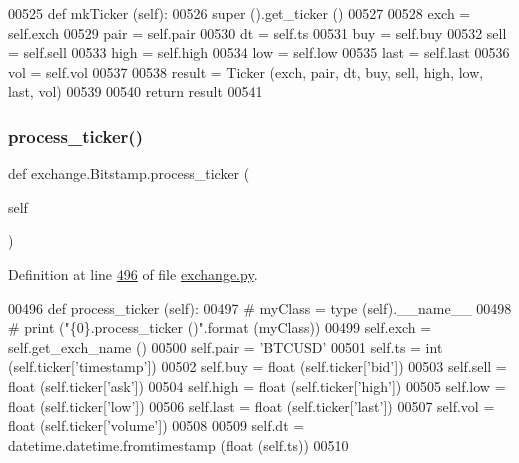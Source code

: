 \begin{DoxyCode}
00525     \textcolor{keyword}{def }mkTicker (self):
00526         super ().get\_ticker ()
00527         
00528         exch = self.exch
00529         pair = self.pair
00530         dt   = self.ts
00531         buy  = self.buy
00532         sell = self.sell
00533         high = self.high
00534         low  = self.low
00535         last = self.last
00536         vol  = self.vol
00537         
00538         result = Ticker (exch, pair, dt, buy, sell, high, low, last, vol)
00539         
00540         \textcolor{keywordflow}{return} result
00541     
\end{DoxyCode}
\mbox{\label{classexchange_1_1_bitstamp_ac963eebe537661b988f0ba0ff72514b5}} 
\subsubsection{\texorpdfstring{process\+\_\+ticker()}{process\_ticker()}}
{\footnotesize\ttfamily def exchange.\+Bitstamp.\+process\+\_\+ticker (\begin{DoxyParamCaption}\item[{}]{self }\end{DoxyParamCaption})}



Definition at line \hyperlink{exchange_8py_source_l00496}{496} of file \hyperlink{exchange_8py_source}{exchange.\+py}.


\begin{DoxyCode}
00496     \textcolor{keyword}{def }process\_ticker (self):
00497 \textcolor{comment}{#        myClass = type (self).\_\_name\_\_}
00498 \textcolor{comment}{#        print ("\{0\}.process\_ticker ()".format (myClass))}
00499         self.exch = self.get\_exch\_name ()
00500         self.pair = \textcolor{stringliteral}{'BTCUSD'}
00501         self.ts   = int   (self.ticker[\textcolor{stringliteral}{'timestamp'}])
00502         self.buy  = float (self.ticker[\textcolor{stringliteral}{'bid'}])
00503         self.sell = float (self.ticker[\textcolor{stringliteral}{'ask'}])
00504         self.high = float (self.ticker[\textcolor{stringliteral}{'high'}])
00505         self.low  = float (self.ticker[\textcolor{stringliteral}{'low'}])
00506         self.last = float (self.ticker[\textcolor{stringliteral}{'last'}])
00507         self.vol  = float (self.ticker[\textcolor{stringliteral}{'volume'}])
00508     
00509         self.dt = datetime.datetime.fromtimestamp (float (self.ts))
00510     
\end{DoxyCode}


